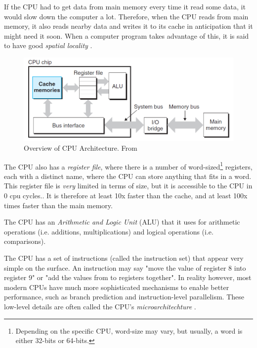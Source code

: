 If the CPU had to get data from main memory every time it read some data, it would slow down the computer a lot. Therefore, when the CPU reads from main memory, it also reads nearby data and writes it to its cache in anticipation that it might need it soon. When a computer program takes advantage of this, it is said to have good \textit{spatial locality} \cite[p. 640]{computersystems}.

\begin{figure}[h]
\includegraphics[width=\textwidth]{Documents/Report/Figures/CPU Architecture.png}
\caption{Overview of CPU Architecture. From \cite{computersystems}}
\label{fig:cpu_architecture}
\end{figure}

The CPU also has a \textit{register file}, where there is a number of word-sized\footnote{Depending on the specific CPU, word-size may vary, but usually, a word is either 32-bits or 64-bits.} registers, each with a distinct name, where the CPU can store anything that fits in a word. This register file is \textit{very} limited in terms of size, but it is accessible to the CPU in 0 cpu cycles.\cite[p. 9-10]{computersystems}. It is therefore at least 10x faster than the cache, and at least 100x times faster than the main memory.

The CPU has an \textit{Arithmetic and Logic Unit} (ALU) that it uses for arithmetic operations (i.e. additions, multiplications) and logical operations (i.e. comparisons).

The CPU has a set of instructions (called the instruction set) that appear very simple on the surface. An instruction may say "move the value of register 8 into register 9" or "add the values from to registers together". In reality however, most modern CPUs have much more sophisticated mechanisms to enable better performance, such as branch prediction and instruction-level parallelism. These low-level details are often called the CPU's \textit{microarchitechture} \cite[p. 10]{computersystems}.\\

